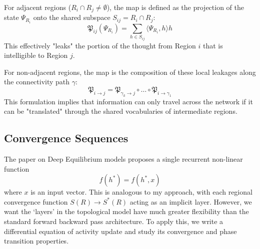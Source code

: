 \documentclass[twocolumn, 10pt]{article}
\begin{document}
For adjacent regions ($R_i \cap R_j \neq \emptyset$), the map is defined as the projection of the state $\Psi_{R_i}$ onto the shared subspace $S_{ij} = R_i \cap R_j$:
\begin{equation}
    \mathfrak{P}_{ij}(\Psi_{R_i}) = \sum_{h \in S_{ij}} \langle \Psi_{R_i}, h \rangle h
\end{equation}
This effectively "leaks" the portion of the thought from Region $i$ that is intelligible to Region $j$.

For non-adjacent regions, the map is the composition of these local leakages along the connectivity path $\gamma$:
\begin{equation}
    \mathfrak{P}_{i \to j} = \mathfrak{P}_{\gamma_k \to j} \circ \dots \circ \mathfrak{P}_{i \to \gamma_1}
\end{equation}
This formulation implies that information can only travel across the network if it can be "translated" through the shared vocabularies of intermediate regions.


\subsection{Convergence Sequences}
The paper on Deep Equilibrium models proposes a single recurrent non-linear function
\begin{equation}
    f(h^*) = f(h^*, x)
\end{equation}
where $x$ is an input vector. This is analogous to my approach, with each regional convergence function $S(R) \to S^*(R)$ acting as an implicit layer. However, we want the `layers' in the topological model have much greater flexibility than the standard forward backward pass architecture. To apply this, we write a differential equation of activity update and study its convergence and phase transition properties. 
\end{document}
